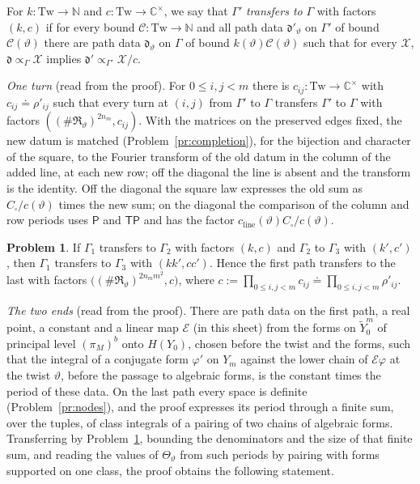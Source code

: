 \documentclass[reqno]{amsart}
\theoremstyle{definition}
\newtheorem{problem}{Problem}[section]
\theoremstyle{plain}
\newcommand{\C}{\mathbb C}
\newcommand{\Tw}{\mathrm{Tw}}
\newcommand{\Yt}{\widetilde Y}
\newcommand{\Rm}{\mathfrak R}
\newcommand{\dd}{\mathfrak d}
\begin{document}
For \(k\colon\Tw\to\mathbb N\) and \(c\colon\Tw\to\C^\times\), we say that \(\Gamma'\) \emph{transfers to} \(\Gamma\) with factors \((k, c)\) if for every bound \(\mathcal C\colon\Tw\to\mathbb N\) and all path data \(\dd'_\vartheta\) on \(\Gamma'\) of bound \(\mathcal C(\vartheta)\) there are path data \(\dd_\vartheta\) on \(\Gamma\) of bound \(k(\vartheta)\mathcal C(\vartheta)\) such that for every \(\mathcal X\), \(\dd \propto_\Gamma \mathcal X\) implies \(\dd' \propto_{\Gamma'} \mathcal X/c\).

\emph{One turn} (read from the proof).  For \(0 \le i, j < m\) there is \(c_{ij}\colon \Tw \to \C^\times\) with \(c_{ij} \doteq \rho'_{ij}\) such that every turn at \((i, j)\) from \(\Gamma'\) to \(\Gamma\) transfers \(\Gamma'\) to \(\Gamma\) with factors \(((\#\Rm_\vartheta)^{2n_m}, c_{ij})\).  With the matrices on the preserved edges fixed, the new datum is matched (Problem~\ref{pr:completion}), for the bijection and character of the square, to the Fourier transform of the old datum in the column of the added line, at each new row; off the diagonal the line is absent and the transform is the identity.  Off the diagonal the square law expresses the old sum as \(C_\square/c(\vartheta)\) times the new sum; on the diagonal the comparison of the column and row periods uses \(\mathsf P\) and \(\mathsf T\mathsf P\) and has the factor \(c_{\mathrm{line}}(\vartheta)C_\square/c(\vartheta)\).

\begin{problem}\label{pr:compose}
If \(\Gamma_1\) transfers to \(\Gamma_2\) with factors \((k, c)\) and \(\Gamma_2\) to \(\Gamma_3\) with \((k', c')\), then \(\Gamma_1\) transfers to \(\Gamma_3\) with \((kk', cc')\).  Hence the first path transfers to the last with factors \(\bigl((\#\Rm_\vartheta)^{2n_m m^2}, c\bigr)\), where \(c := \prod_{0 \le i, j < m}c_{ij} \doteq \prod_{0 \le i,j < m}\rho'_{ij}\).
\end{problem}

\emph{The two ends} (read from the proof).  There are path data on the first path, a real point, a constant and a linear map \(\mathcal E\) (in this sheet) from the forms on \(\Yt^m_0\) of principal level \((\pi_M)^b\) onto \(H(Y_0)\), chosen before the twist and the forms, such that the integral of a conjugate form \(\varphi'\) on \(Y_m\) against the lower chain of \(\mathcal E\varphi\) at the twist \(\vartheta\), before the passage to algebraic forms, is the constant times the period of these data.  On the last path every space is definite (Problem~\ref{pr:nodes}), and the proof expresses its period through a finite sum, over the tuples, of class integrals of a pairing of two chains of algebraic forms.  Transferring by Problem~\ref{pr:compose}, bounding the denominators and the size of that finite sum, and reading the values of \(\Theta_\vartheta\) from such periods by pairing with forms supported on one class, the proof obtains the following statement.
\end{document}
